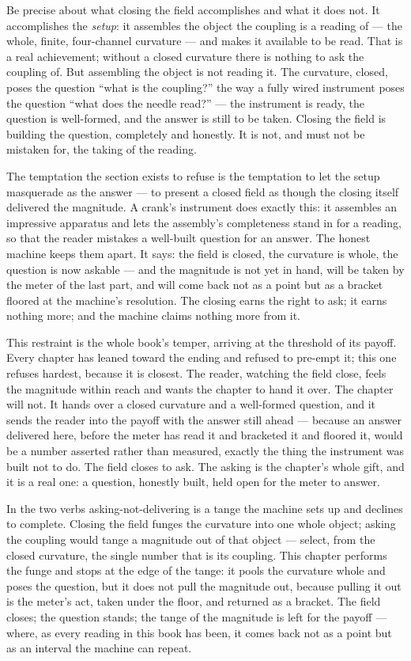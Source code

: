 Be precise about what closing the field accomplishes and what it does not. It accomplishes the \emph{setup}: it assembles
the object the coupling is a reading of --- the whole, finite, four-channel curvature --- and makes it available to be
read. That is a real achievement; without a closed curvature there is nothing to ask the coupling of. But assembling the
object is not reading it. The curvature, closed, poses the question ``what is the coupling?'' the way a fully wired
instrument poses the question ``what does the needle read?'' --- the instrument is ready, the question is well-formed,
and the answer is still to be taken. Closing the field is building the question, completely and honestly. It is not, and
must not be mistaken for, the taking of the reading.

The temptation the section exists to refuse is the temptation to let the setup masquerade as the answer --- to present a
closed field as though the closing itself delivered the magnitude. A crank's instrument does exactly this: it assembles
an impressive apparatus and lets the assembly's completeness stand in for a reading, so that the reader mistakes a
well-built question for an answer. The honest machine keeps them apart. It says: the field is closed, the curvature is
whole, the question is now askable --- and the magnitude is not yet in hand, will be taken by the meter of the last part,
and will come back not as a point but as a bracket floored at the machine's resolution. The closing earns the right to
ask; it earns nothing more; and the machine claims nothing more from it.

This restraint is the whole book's temper, arriving at the threshold of its payoff. Every chapter has leaned toward the
ending and refused to pre-empt it; this one refuses hardest, because it is closest. The reader, watching the field close,
feels the magnitude within reach and wants the chapter to hand it over. The chapter will not. It hands over a closed
curvature and a well-formed question, and it sends the reader into the payoff with the answer still ahead --- because an
answer delivered here, before the meter has read it and bracketed it and floored it, would be a number asserted rather
than measured, exactly the thing the instrument was built not to do. The field closes to ask. The asking is the
chapter's whole gift, and it is a real one: a question, honestly built, held open for the meter to answer.

In the two verbs asking-not-delivering is a tange the machine sets up and declines to complete. Closing the field funges
the curvature into one whole object; asking the coupling would tange a magnitude out of that object --- select, from the
closed curvature, the single number that is its coupling. This chapter performs the funge and stops at the edge of the
tange: it pools the curvature whole and poses the question, but it does not pull the magnitude out, because pulling it out
is the meter's act, taken under the floor, and returned as a bracket. The field closes; the question stands; the tange of
the magnitude is left for the payoff --- where, as every reading in this book has been, it comes back not as a point but
as an interval the machine can repeat.
